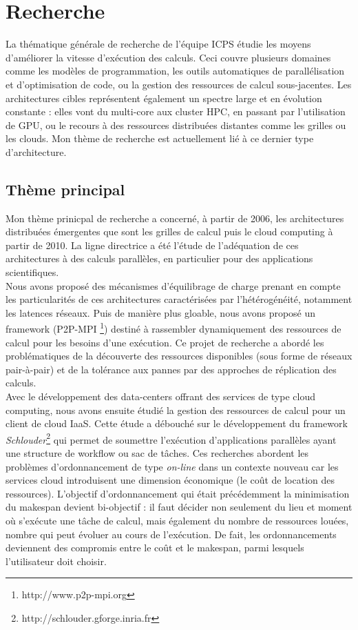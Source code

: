 \newpage
\section{Recherche}

La  thématique  générale  de  recherche  de  l'équipe  ICPS  étudie  les  moyens
d'améliorer la vitesse  d'exécution des calculs. Ceci  couvre plusieurs domaines
comme les modèles  de programmation, les outils  automatiques de parallélisation
et d'optimisation de code, ou la  gestion des ressources de calcul sous-jacentes.
Les architectures cibles représentent également un spectre large et en évolution
constante  :  elles  vont  du  multi-core   aux  cluster  HPC,  en  passant  par
l'utilisation de GPU, ou le recours à des ressources distribuées distantes comme
les grilles  ou les  clouds. Mon thème  de recherche est  actuellement lié  à ce
dernier type d'architecture.


\subsection{Thème principal}
Mon thème prinicpal de recherche a concerné, à partir de 2006, les architectures
distribuées émergentes que sont les grilles  de calcul puis le cloud computing à
partir  de 2010.   La ligne  directrice  a été  l'étude de  l'adéquation de  ces
architectures à  des calculs  parallèles, en  particulier pour  des applications
scientifiques.\\

Nous avons proposé des mécanismes d'équilibrage de charge prenant
en   compte  les   particularités   de  ces   architectures  caractérisées   par
l'hétérogénéité, notamment les  latences réseaux. Puis de  manière plus gloable,
nous avons proposé un framework (P2P-MPI%
\footnote{http://www.p2p-mpi.org}) destiné à rassembler dynamiquement des
ressources de calcul pour les besoins  d'une exécution. Ce projet de recherche a
abordé  les problématiques  de la  découverte des  ressources disponibles  (sous
forme de réseaux pair-à-pair) et de la tolérance aux pannes par des approches de
réplication des calculs.\\

Avec  le développement  des  data-centers  offrant des  services  de type  cloud
computing, nous avons ensuite étudié la gestion des ressources de calcul pour un
client de cloud  IaaS. Cette étude a débouché sur  le développement du framework
\emph{Schlouder}\footnote{http://schlouder.gforge.inria.fr}   qui    permet   de
soumettre l'exécution d'applications parallèles  ayant une structure de workflow
ou sac de tâches. Ces recherches abordent les problèmes d'ordonnancement de type
\emph{on-line} dans un contexte nouveau  car les services cloud introduisent une
dimension  économique   (le  coût  de  location   des  ressources).   L'objectif
d'ordonnancement  qui était  précédemment  la minimisation  du makespan  devient
bi-objectif : il faut  décider non seulement du lieu et  moment où s'exécute une
tâche de calcul, mais également du  nombre de ressources louées, nombre qui peut
évoluer au  cours de  l'exécution. De fait,  les ordonnancements  deviennent des
compromis  entre le  coût  et  le makespan,  parmi  lesquels l'utilisateur  doit
choisir.

